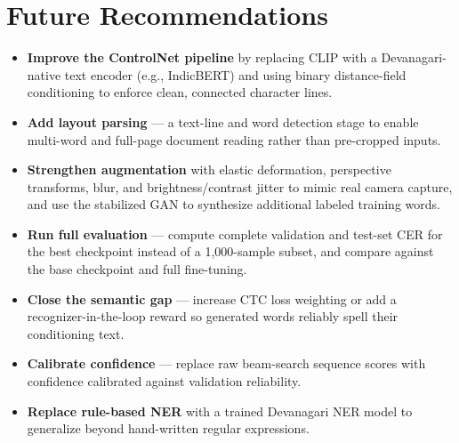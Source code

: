 \documentclass[12pt,a4paper]{report}
\begin{document}
\section{Future Recommendations}
\begin{itemize}[itemsep=2pt]
  \item \textbf{Improve the ControlNet pipeline} by replacing CLIP with a Devanagari-native text encoder (e.g., IndicBERT) and using binary distance-field conditioning to enforce clean, connected character lines.
  \item \textbf{Add layout parsing} --- a text-line and word detection stage to enable multi-word and full-page document reading rather than pre-cropped inputs.
  \item \textbf{Strengthen augmentation} with elastic deformation, perspective transforms, blur, and brightness/contrast jitter to mimic real camera capture, and use the stabilized GAN to synthesize additional labeled training words.
  \item \textbf{Run full evaluation} --- compute complete validation and test-set CER for the best checkpoint instead of a 1{,}000-sample subset, and compare against the base checkpoint and full fine-tuning.
  \item \textbf{Close the semantic gap} --- increase CTC loss weighting or add a recognizer-in-the-loop reward so generated words reliably spell their conditioning text.
  \item \textbf{Calibrate confidence} --- replace raw beam-search sequence scores with confidence calibrated against validation reliability.
  \item \textbf{Replace rule-based NER} with a trained Devanagari NER model to generalize beyond hand-written regular expressions.
\end{itemize}
\end{document}
